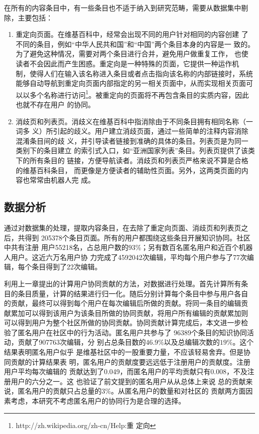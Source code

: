 在所有的内容条目中，有一些条目也不适于纳入到研究范畴，需要从数据集中剔
除，主要包括：
\begin{enumerate}
\item 重定向页面。在维基百科中，经常会出现不同的用户针对相同的内容创建
  了不同的条目，例如“中华人民共和国”和“中国”两个条目本身的内容是一
  致的。为了避免这种情况，需要对两个条目进行合并，避免用户做重复工作，
  也使读者不会因此而产生困惑。重定向是一种特殊的页面，它提供一种运作机
  制，使得人们在输入该名称进入条目或者点击指向该名称的内部链接时，系统
  能够自动导航到重定向页面内部指定的另一相关页面中，从而实现相关页面可
  以以多个名称进行访问\footnote{http://zh.wikipedia.org/zh-cn/Help:重
    定向}。被重定向的页面将不再包含条目的实质内容，因此也就不存在用户
  的协同。
\item 消歧页和列表页。消歧义在维基百科中指消除由于不同条目拥有相同名称（一词多
  义）所引起的歧义。用户建立消歧页面，通过一些简单的注释内容消除混淆条目间的歧
  义，并引导读者链接到准确的具体的条目。列表页是为同一类别下的条目建立
  的索引式入口，如“亚洲国家列表”条目。列表页提供了该类下的所有条目的
  链接，方便导航读者。消歧页和列表页严格来说不算是合格的维基百科条目，
  而更像是方便读者的辅助性页面。另外，这两类页面的内容也常常由机器人完
  成。 
\end{enumerate}

\subsection{数据分析}
\label{sec:data-analysis}
通过对数据集的处理，提取内容条目，在去除了重定向页面、消歧页和列表页之后，共得到
205378个条目页面。所有的用户都围绕这些条目开展知识协同。社区中共有注册
用户55218名，占总用户数的$93\%$；另有数百名匿名用户和近百个机器人用户。这近六万名用户协
力完成了4592042次编辑，平均每个用户参与了77次编辑，每个条目得到了22次编辑。

利用上一章提出的计算用户协同贡献的方法，对数据进行处理。首先计算所有条
目的条目质量，计算的结果进行归一化。随后分别计算每个条目中参与用户各自
的贡献，最终可以得到每个用户在每次编辑后所做的贡献。将同一条目的编辑贡
献累加可以得到该用户为该条目所做的协同贡献，将用户所有编辑的贡献累加则
可以得到用户为整个社区所做的协同贡献。协同贡献计算完成后，本文进一步检
验了匿名用户在社区中的行为活动。匿名用户共参与了 96389个条目的知识协同活动，贡献了907763次编辑，分
别占总条目数的$46.9\%$以及总编辑次数的$19\%$。这个结果表明匿名用户似乎
是维基社区中的一股重要力量，不应该轻易舍弃。但是协同贡献的计算结果表
明，匿名用户的贡献度要远远低于注册用户的贡献度。注册用户平均每次编辑的
贡献达到了0.049，而匿名用户的平均贡献只有0.008，不及注册用户的六分之一。这
也验证了前文提到的匿名用户从从总体上来说
总的贡献来说，匿名用户的贡献只占总量的$3\%$。从匿名用户的数量和对社区的
贡献两方面因素考虑，本研究不考虑匿名用户的协同行为是合理的选择。

